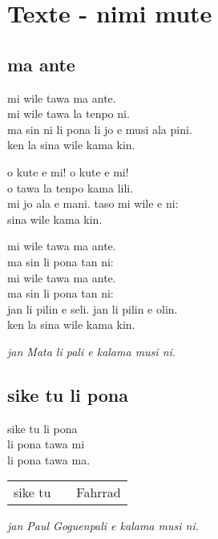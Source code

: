 \section{Texte - nimi mute}
\subsection{ma ante}

mi wile tawa ma ante. \\
mi wile tawa la tenpo ni.   \\
ma sin ni li pona li jo e musi ala pini. \\
ken la sina wile kama kin.  

o kute e mi! o kute e mi!  \\
o tawa la tenpo kama lili.    \\
mi jo ala e mani. taso mi wile e ni: \\
sina wile kama kin. 

mi wile tawa ma ante. \\
ma sin li pona tan ni: \\
mi wile tawa ma ante. \\
ma sin li pona tan ni: \\
jan li pilin e seli. jan li pilin e olin. \\
ken la sina wile kama kin. 

\textit{jan Mata li pali e kalama musi ni. \cite{www:Mata:01,www:Mata:02}}
%
\subsection{sike tu li pona}

sike tu li pona  \\
li pona tawa mi  \\
li pona tawa ma. 

\begin{supertabular}{p{5,5cm}|ll}
sike tu && Fahrrad \\ 
\end{supertabular}

\textit{jan \glqq Paul Goguen\grqq  pali e kalama musi ni. \cite{www:PaulGoguen:01}}
%

